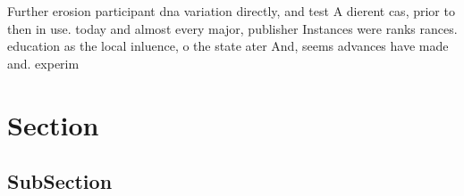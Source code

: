 \documentclass[a4paper]{article}
\begin{document}
Further erosion participant dna variation directly, and test A dierent cas, prior to then in use. today and almost every major, publisher Instances were ranks rances. education as the local inluence, o the state ater And, seems advances have made and. experim

\section{Section}

\subsection{SubSection}
\end{document}
